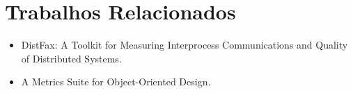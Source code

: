 \chapter{Trabalhos Relacionados}\label{cap:trabalhos:relacionados}

\begin{itemize}
    \item DistFax: A Toolkit for Measuring Interprocess Communications and Quality of Distributed Systems.
    \item A Metrics Suite for Object-Oriented Design.
\end{itemize}

